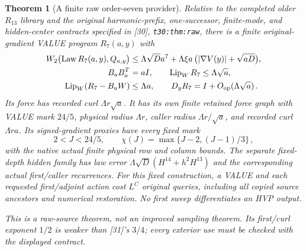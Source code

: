 \documentclass[11pt]{article}
\numberwithin{equation}{section}
\newtheorem{theorem}{Theorem}[section]
\theoremstyle{remark}\newtheorem{remark}[theorem]{Remark}
\newcommand{\Law}{\operatorname{Law}}\newcommand{\Lip}{\operatorname{Lip}}
\newcommand{\op}{\mathrm{op}}\newcommand{\LL}{\Lambda}
\newcommand{\src}[1]{\texttt{\nolinkurl{#1}}}
\begin{document}
\begin{theorem}[A finite raw order-seven provider]
\label{thm:raw-seven}
Relative to the completed older $R_{13}$ library and the original
harmonic-prefix, one-successor, finite-mode, and hidden-center
contracts specified in [30], \src{t30:thm:raw}, there is a finite
original-gradient VALUE program $R_7(a,y)$ with
\begin{align}\label{eq:raw-seven-contract}
 W_2\bigl(\Law R_7(a,y),Q_{a,y}\bigr)
 &\le\LL\sqrt D a^7
       +\LL\xi a\,\bigl(|\nabla V(y)|+\sqrt{aD}\bigr),\notag\\
 B_aB_a^T&=aI,\qquad \Lip_W R_7\le\LL\sqrt a,\notag\\
 \Lip_W(R_7-B_aW)&\le\LL a,\qquad
 D_yR_7=I+O_{\op}(\LL\sqrt a)\,.
\end{align}
Its force has recorded curl $\LL r\sqrt a$.
It has its own finite retained force graph with VALUE mark $24/5$,
physical radius $\LL r$, caller radius $\LL r/\sqrt a$, and
recorded curl $\LL ra$. Its signed-gradient proxies have every
fixed mark
\begin{equation}\label{eq:raw-seven-proxies}
 2<J<24/5,\qquad
 \chi(J)=\max\{J-2,(J-1)/3\}\,,
\end{equation}
with the native actual finite physical row and column bounds.
The separate fixed-depth hidden family has law error
$\LL\sqrt D(H^{14}+h^2H^{13})$ and the corresponding actual
first/caller recurrences. For this fixed construction, a VALUE and
each requested first/adjoint action cost $L^C$ original queries,
including all copied source ancestors and numerical restoration.
No first sweep differentiates an HVP output.

This is a raw-source theorem, not an improved sampling theorem.
Its first/curl exponent $1/2$ is weaker than [31]'s $3/4$;
every exterior use must be checked with the displayed contract.
\end{theorem}
\end{document}
